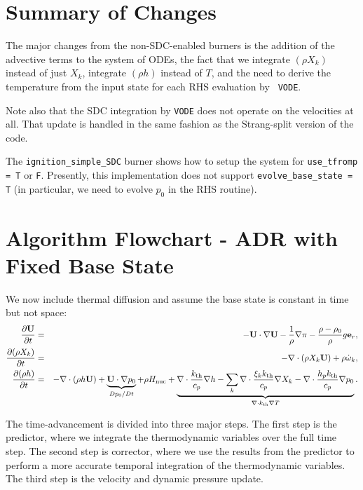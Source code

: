 \section{Summary of Changes}
The major changes from the non-SDC-enabled burners is the addition of
the advective terms to the system of ODEs, the fact that we integrate
$(\rho X_k)$ instead of just $X_k$, integrate $(\rho h)$ instead
of $T$, and the need to derive the
temperature from the input state for each RHS evaluation by {\tt
  VODE}.

Note also that the SDC integration by {\tt VODE} does not operate on 
the velocities at all.  That update is handled in the same fashion 
as the Strang-split version of the code.

The {\tt ignition\_simple\_SDC} burner shows how to setup the system
for {\tt use\_tfromp = T} or {\tt F}.  Presently, this implementation
does not support {\tt evolve\_base\_state = T} (in particular, we 
need to evolve $p_0$ in the RHS routine).

\section{Algorithm Flowchart - ADR with Fixed Base State}
We now include thermal diffusion and assume the base state is constant in time but not space:
\begin{eqnarray}
\frac{\partial{\bf U}}{\partial t} &=& 
    -{\bf U}\cdot\nabla{\bf U}  - \frac{1}{\rho}\nabla\pi 
    - \frac{\rho-\rho_0}{\rho} g{\bf e}_r,\\
\frac{\partial(\rho X_k)}{\partial t} &=& 
    -\nabla\cdot(\rho X_k{\bf U}) + \rho\dot{\omega}_k,\label{eq:sdc species}\\
\frac{\partial(\rho h)}{\partial t} &=&
    -\nabla\cdot(\rho h{\bf U}) + \underbrace{{\bf U}\cdot\nabla p_0}_{Dp_0/Dt}
    + \rho{H_{\rm nuc}}
    + \underbrace{\nabla\cdot\frac{k_{\rm th}}{c_p}\nabla h - \sum_k\nabla\cdot\frac{\xi_k k_{\rm th}}{c_p}\nabla X_k - \nabla\cdot\frac{h_p k_{\rm th}}{c_p}\nabla p_0}_{\nabla\cdot k_{\rm th}\nabla T}.\label{eq:sdc enthalpy}
\end{eqnarray}

The time-advancement is divided into three major steps.  The first step is the predictor, where we integrate the thermodynamic variables over the full time step.  The second step is corrector, where we use the results from the predictor to perform a more accurate temporal integration of the thermodynamic variables.  The third step is the velocity and dynamic pressure update.

